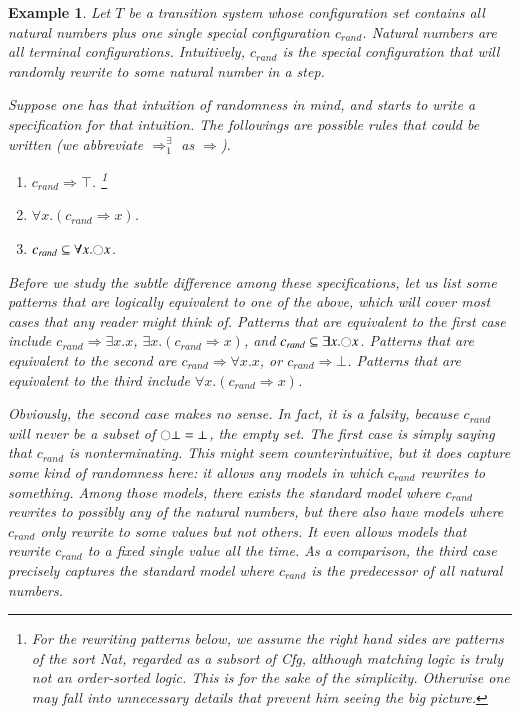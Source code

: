 \documentclass{article}
\theoremstyle{plain}
\newtheorem{eg}[thm]{Example}
\def\snext{\fullmoon}
\def\Cfg{\textit{Cfg}}
\begin{document}
\begin{eg}
	Let $T$ be a transition system whose configuration set contains all natural numbers plus one single special configuration $c_\textit{rand}$. Natural numbers are all terminal configurations. Intuitively, $c_\textit{rand}$ is the special configuration that will randomly rewrite to some natural number in a step.
	
	Suppose one has that intuition of randomness in mind, and starts to write a specification for that intuition. The followings are possible rules that could be written (we abbreviate $\Rightarrow^{\exists}_1$ as $\Rightarrow$).
	\begin{enumerate}
		\item $c_\textit{rand} \Rightarrow \top$. \footnote{For the rewriting patterns below, we assume the right hand sides are patterns of the sort \textit{Nat}, regarded as a subsort of \Cfg, although matching logic is truly not an order-sorted logic. This is for the sake of the simplicity. Otherwise one may fall into unnecessary details that prevent him seeing the big picture. } 
	    \item $\forall x . (c_\textit{rand} \Rightarrow x)$.
	    \item $c_\textit{rand} \subseteq \forall x . \snext x$.
	\end{enumerate}
Before we study the subtle difference among these specifications, let us list some patterns that are logically equivalent to one of the above, which will cover most cases that any reader might think of. Patterns that are equivalent to the first case include $c_\textit{rand} \Rightarrow \exists x . x$,
$\exists x . (c_\textit{rand} \Rightarrow x)$,
and $c_\textit{rand} \subseteq \exists x . \snext x$. Patterns that are equivalent to the second are
$c_\textit{rand} \Rightarrow \forall x . x$, or
$c_\textit{rand} \Rightarrow \bot$. Patterns that are equivalent to the third include $\forall x . (c_\textit{rand} \Rightarrow x)$.

Obviously, the second case makes no sense. In fact, it is a falsity, because $c_\textit{rand}$ will never be a subset of $\snext \bot = \bot$, the empty set. The first case is simply saying that $c_\textit{rand}$ is nonterminating. This might seem counterintuitive, but it does capture some kind of randomness here: it allows \emph{any models} in which $c_\textit{rand}$ rewrites to something. Among those models, there exists the standard model where $c_\textit{rand}$ rewrites to possibly any of the natural numbers, but there also have models where $c_\textit{rand}$ only rewrite to some values but not others. It even allows models that rewrite $c_\textit{rand}$ to a fixed single value all the time. As a comparison, the third case precisely captures the standard model where $c_\textit{rand}$ is the predecessor of \emph{all natural numbers}.


\end{eg}
\end{document}
